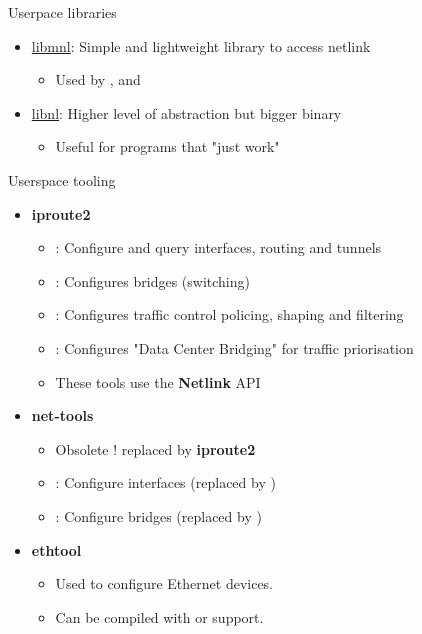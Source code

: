 \begin{frame}{Userpace libraries}
	\begin{itemize}
		\item \href{https://www.netfilter.org/projects/libmnl/index.html}{libmnl}: Simple and lightweight library to access netlink
			\begin{itemize}
				\item Used by ,  and 
			\end{itemize}
		\item \href{https://www.infradead.org/~tgr/libnl/}{libnl}: Higher level of abstraction but bigger binary
			\begin{itemize}
				\item Useful for programs that "just work"
			\end{itemize}
	\end{itemize}
\end{frame}

\begin{frame}{Userspace tooling}
	\begin{itemize}
		\item \textbf{iproute2}
			\begin{itemize}
				\item {} : Configure and query interfaces, routing and tunnels
				\item {} : Configures bridges (switching)
				\item {} : Configures traffic control policing, shaping and filtering
				\item {} : Configures "Data Center Bridging" for traffic priorisation
				\item These tools use the \textbf{Netlink} API
			\end{itemize}
		\item \textbf{net-tools}
			\begin{itemize}
				\item Obsolete ! replaced by \textbf{iproute2}
				\item {} : Configure interfaces (replaced by )
				\item {} : Configure bridges (replaced by )
			\end{itemize}
		\item \textbf{ethtool}
			\begin{itemize}
				\item Used to configure Ethernet devices.
				\item Can be compiled with  or  support.
			\end{itemize}
	\end{itemize}
\end{frame}

